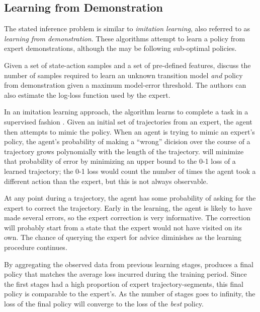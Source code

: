 \subsection{Learning from Demonstration}

    The stated inference problem is similar to \emph{imitation learning}, also referred to as \textit{learning from
    demonstration}. These algorithms attempt to learn a policy from expert demonstrations, although the
     may be following sub-optimal policies.

    Given a set of state-action samples and a set of pre-defined features, \cite{Hanawal2017LearningPolicies} discuss
    the number of samples required to learn an unknown transition model \emph{and} policy from demonstration given a
    maximum model-error threshold. The authors can also estimate the log-loss function used by the expert.

    In an imitation learning approach, the \DAGGER algorithm learns to complete a task in a supervised fashion
    \cite{ross2011reduction}. Given an initial set of trajectories from an expert, the agent then attempts to mimic the
    policy. When an agent is trying to mimic an expert's policy, the agent's probability of making a ``wrong'' dicision
    over the course of a trajectory grows polynomially with the length of the trajectory. \DAGGER will minimize that
    probability of error by minimizing an upper bound to the 0-1 loss of a learned trajectory; the 0-1 loss would count
    the number of times the agent took a different action than the expert, but this is not always observable.

    At any point during a trajectory, the agent has some probability of asking for the expert to correct the trajectory.
    Early in the learning, the agent is likely to have made several errors, so the expert correction is very
    informative. The correction will probably start from a state that the expert would not have visited on its own. The
    chance of querying the expert for advice diminishes as the learning procedure continues.

    By aggregating the observed data from previous learning stages, \DAGGER produces a final policy that matches the
    average loss incurred during the training period. Since the first stages had a high proportion of expert
    trajectory-segments, this final policy is comparable to the expert's. As the number of stages goes to infinity, the
    loss of the final policy will converge to the loss of the \emph{best} policy.

